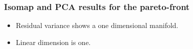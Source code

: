 \documentclass[svgnames, table, smaller]{beamer}
\begin{document}
\begin{frame}
  \frametitle{Isomap and PCA results for the pareto-front}

  \begin{itemize}
  \item Residual variance shows a one dimensional manifold.
  \item Linear dimension is one.
  \end{itemize}
  
  \begin{figure}[ht]
    \begin{center}
      \label{wbeampareto}
    \end{center}
  \end{figure}


\end{frame}
\end{document}
